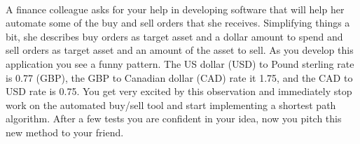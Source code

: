 \documentclass[12pt]{article}
\begin{document}
\renewcommand{\headrulewidth}{0.5pt}

\phantom{Test}
\\ A finance colleague asks for your help in developing software that will help
her automate some of the buy and sell orders that she receives. Simplifying
things a bit, she describes buy orders as target asset and a dollar amount to
spend and sell orders as target asset and an amount of the asset to sell. As
you develop this application you see a funny pattern. The US dollar (USD) to
Pound sterling rate is 0.77 (GBP), the GBP to Canadian dollar (CAD) rate it
1.75, and the CAD to USD rate is 0.75. You get very excited by this observation
and immediately stop work on the automated buy/sell tool and start implementing
a shortest path algorithm. After a few tests you are confident in your idea,
now you pitch this new method to your friend.


\pagebreak
\end{document}
